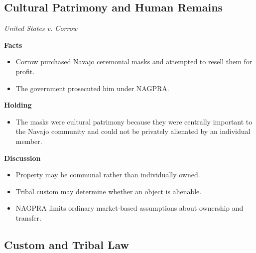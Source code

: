 \documentclass[11pt]{tex/lawoutline}
\begin{document}
\subsection{Cultural Patrimony and Human Remains}


\casebox
{\textit{United States v. Corrow}}
{}
{
\textbf{Facts}
\begin{itemize}
    \item Corrow purchased Navajo ceremonial masks and attempted to resell them for profit.
    \item The government prosecuted him under NAGPRA.
\end{itemize}

\textbf{Holding}
\begin{itemize}
    \item The masks were cultural patrimony because they were centrally important to the Navajo community and could not be privately alienated by an individual member.
\end{itemize}

\textbf{Discussion}
\begin{itemize}
    \item Property may be communal rather than individually owned.
    \item Tribal custom may determine whether an object is alienable.
    \item NAGPRA limits ordinary market-based assumptions about ownership and transfer.
\end{itemize}
}

\subsection{Custom and Tribal Law}
\end{document}
